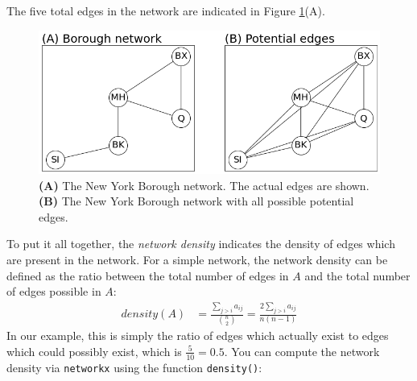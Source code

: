The five total edges in the network are indicated in Figure \ref{fig:ch4:density}(A).

\begin{figure}[h]
    \centering
    \includegraphics[width=0.8\linewidth]{representations/ch4/Images/density.png}
    \caption[Visualizing network density]{\textbf{(A)} The New York Borough network. The actual edges are shown. \textbf{(B)} The New York Borough network with all possible potential edges.}
    \label{fig:ch4:density}
\end{figure}

To put it all together, the \textit{network density} indicates the {density of edges} which are present in the network. For a simple network, the network density can be defined as the ratio between the total number of edges in $A$ and the total number of edges possible in $A$:
\begin{align}
    density(A) &= \frac{\sum_{j > i}a_{ij}}{\binom n 2} = \frac{2\sum_{j > i}a_{ij}}{n(n - 1)}
    \label{eqn:ch4:netdens}
\end{align}
In our example, this is simply the ratio of edges which {actually} exist to edges which could {possibly} exist, which is $\frac{5}{10} = 0.5$. You can compute the network density via \texttt{networkx} using the function \texttt{density()}:

